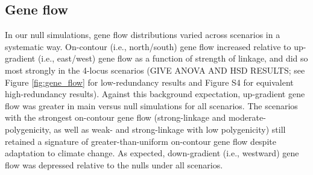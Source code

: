 \documentclass[9pt,twocolumn,twoside,lineno]{pnas-new}
\begin{document}
\subsection{Gene flow}

In our null simulations, gene flow distributions varied across scenarios in a systematic way.
On-contour (i.e., north/south) gene flow increased relative to up-gradient (i.e., east/west)
gene flow as a function of strength of linkage, and did so most strongly in the 4-locus scenarios
(GIVE ANOVA AND HSD RESULTS; see Figure \ref{fig:gene_flow} for low-redundancy results
and Figure S4 for equivalent high-redundancy results).
Against this background expectation, up-gradient gene flow
was greater in main versus null simulations for all scenarios.
The scenarios with the strongest on-contour gene flow (strong-linkage and moderate-polygenicity,
as well as weak- and strong-linkage with low polygenicity) still retained a signature of
greater-than-uniform on-contour gene flow despite adaptation to climate change.
As expected, down-gradient (i.e., westward) gene flow was depressed relative to the nulls under all scenarios.
\end{document}
